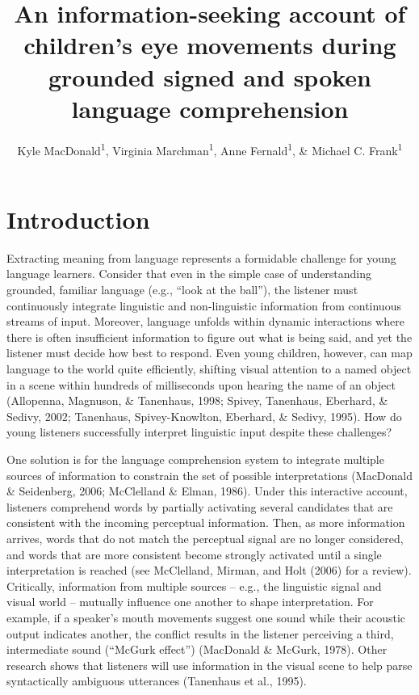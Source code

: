 \documentclass[english,floatsintext,man]{apa6}
\title{An information-seeking account of children's eye movements during
grounded signed and spoken language comprehension}
\author{Kyle MacDonald\textsuperscript{1}, Virginia Marchman\textsuperscript{1}, Anne Fernald\textsuperscript{1}, \& Michael C. Frank\textsuperscript{1}}
\affiliation{
    \vspace{0.5cm}
          \textsuperscript{1} Stanford University  }
\theoremstyle{definition}
\theoremstyle{definition}
\theoremstyle{definition}
\theoremstyle{remark}
\begin{document}
\maketitle

\setcounter{secnumdepth}{0}



\hypertarget{introduction}{%
\section{Introduction}\label{introduction}}

Extracting meaning from language represents a formidable challenge for
young language learners. Consider that even in the simple case of
understanding grounded, familiar language (e.g., \enquote{look at the
ball}), the listener must continuously integrate linguistic and
non-linguistic information from continuous streams of input. Moreover,
language unfolds within dynamic interactions where there is often
insufficient information to figure out what is being said, and yet the
listener must decide how best to respond. Even young children, however,
can map language to the world quite efficiently, shifting visual
attention to a named object in a scene within hundreds of milliseconds
upon hearing the name of an object (Allopenna, Magnuson, \& Tanenhaus,
1998; Spivey, Tanenhaus, Eberhard, \& Sedivy, 2002; Tanenhaus,
Spivey-Knowlton, Eberhard, \& Sedivy, 1995). How do young listeners
successfully interpret linguistic input despite these challenges?

One solution is for the language comprehension system to integrate
multiple sources of information to constrain the set of possible
interpretations (MacDonald \& Seidenberg, 2006; McClelland \& Elman,
1986). Under this interactive account, listeners comprehend words by
partially activating several candidates that are consistent with the
incoming perceptual information. Then, as more information arrives,
words that do not match the perceptual signal are no longer considered,
and words that are more consistent become strongly activated until a
single interpretation is reached (see McClelland, Mirman, and Holt
(2006) for a review). Critically, information from multiple sources --
e.g., the linguistic signal and visual world -- mutually influence one
another to shape interpretation. For example, if a speaker's mouth
movements suggest one sound while their acoustic output indicates
another, the conflict results in the listener perceiving a third,
intermediate sound (\enquote{McGurk effect}) (MacDonald \& McGurk,
1978). Other research shows that listeners will use information in the
visual scene to help parse syntactically ambiguous utterances (Tanenhaus
et al., 1995).
\end{document}
